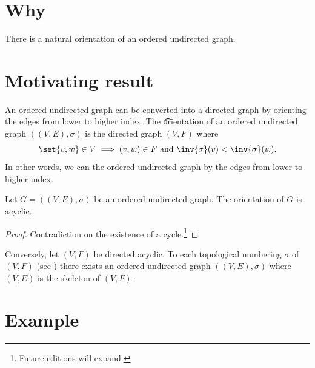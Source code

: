 

\section*{Why}

There is a natural orientation of an ordered undirected graph.

\section*{Motivating result}

An ordered undirected graph can be converted into a directed graph by orienting the edges from lower to higher index.
The \t{orientation} of an ordered undirected graph $((V, E),\sigma )$ is the directed graph $(V, F)$ where
    \[
\set{v, w} \in V \implies (v, w) \in F \text{ and } \inv{\sigma }(v) < \inv{\sigma }(w).
    \]
In other words, we can  the ordered undirected graph by  the edges from lower to higher index.

\begin{proposition}
Let $G = ((V, E), \sigma )$ be an ordered undirected graph.
The orientation of $G$ is acyclic.
\begin{proof}Contradiction on the existence of a cycle.\footnote{Future editions will expand.}\end{proof}\end{proposition}
Conversely, let $(V, F)$ be directed acyclic.
To each topological numbering $\sigma $ of $(V, F)$ (see ) there exists an ordered undirected graph $((V, E), \sigma )$ where $(V, E)$ is the skeleton of $(V, F)$.

\section*{Example}

